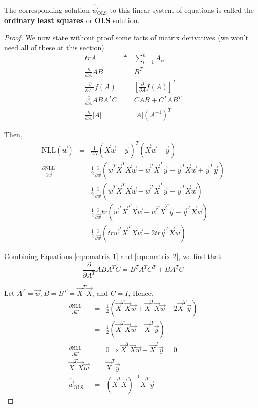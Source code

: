 \documentclass[]{article}
\begin{document}
The corresponding solution $\hat{\vec{w}}_{\mathrm{OLS}}$ to this linear system of equations is called the \textbf{ordinary least squares} or \textbf{OLS} solution.

\begin{proof}
	We now state without proof some facts of matrix derivatives (we won’t need all of these at this section).
	\begin{eqnarray}
	trA &\triangleq& \sum\limits_{i=1}^n A_{ii} \nonumber \\
	\frac{\partial}{\partial A}AB &=& B^T \\
	\frac{\partial}{\partial A^T}f(A) &=& \left[\frac{\partial}{\partial A}f(A)\right]^T \label{eqn:matrix-1} \\
	\frac{\partial}{\partial A}ABA^TC &=& CAB+C^TAB^T \label{eqn:matrix-2} \\
	\frac{\partial}{\partial A}|A| &=& |A|(A^{-1})^T
	\end{eqnarray}
	
	Then,
	\begin{eqnarray*}
		\text{NLL}(\vec{w}) &=& \frac{1}{2N}(\vec{X}\vec{w}-\vec{y})^T(\vec{X}\vec{w}-\vec{y}) \\
		\frac{\partial \text{NLL}}{\partial\vec{w}} &=& \frac{1}{2} \frac{\partial}{\partial\vec{w}} (\vec{w}^T\vec{X}^T\vec{X}\vec{w}-\vec{w}^T\vec{X}^T\vec{y}-\vec{y}^T\vec{X}\vec{w}+\vec{y}^T\vec{y}) \\
		&=& \frac{1}{2} \frac{\partial}{\partial\vec{w}} (\vec{w}^T\vec{X}^T\vec{X}\vec{w}-\vec{w}^T\vec{X}^T\vec{y}-\vec{y}^T\vec{X}\vec{w}) \\
		&=& \frac{1}{2} \frac{\partial}{\partial\vec{w}} tr(\vec{w}^T\vec{X}^T\vec{X}\vec{w}-\vec{w}^T\vec{X}^T\vec{y}-\vec{y}^T\vec{X}\vec{w}) \\
		&=& \frac{1}{2} \frac{\partial}{\partial\vec{w}} (tr\vec{w}^T\vec{X}^T\vec{X}\vec{w}-2tr\vec{y}^T\vec{X}\vec{w})
	\end{eqnarray*}
	
	Combining Equations \ref{eqn:matrix-1} and \ref{eqn:matrix-2}, we find that 
	\begin{equation*}
	\frac{\partial}{\partial A^T}ABA^TC = B^TA^TC^T+BA^TC
	\end{equation*}
	
	Let $A^T=\vec{w}, B=B^T=\vec{X}^T\vec{X}$, and $C=I$, Hence,
	\begin{eqnarray}
	\frac{\partial \text{NLL}}{\partial\vec{w}} &=& \frac{1}{2} (\vec{X}^T\vec{X}\vec{w}+\vec{X}^T\vec{X}\vec{w} -2\vec{X}^T\vec{y}) \nonumber \\
	&=& \frac{1}{2} (\vec{X}^T\vec{X}\vec{w} - \vec{X}^T\vec{y}) \nonumber \\
	\frac{\partial \text{NLL}}{\partial\vec{w}} &=& 0 \Rightarrow \vec{X}^T\vec{X}\vec{w} - \vec{X}^T\vec{y} =0 \nonumber \\
	\vec{X}^T\vec{X}\vec{w} &=& \vec{X}^T\vec{y} \label{eqn:normal-equation} \\
	\hat{\vec{w}}_{\mathrm{OLS}} &=& (\vec{X}^T\vec{X})^{-1}\vec{X}^T\vec{y} \nonumber
	\end{eqnarray}
\end{proof}
\end{document}

